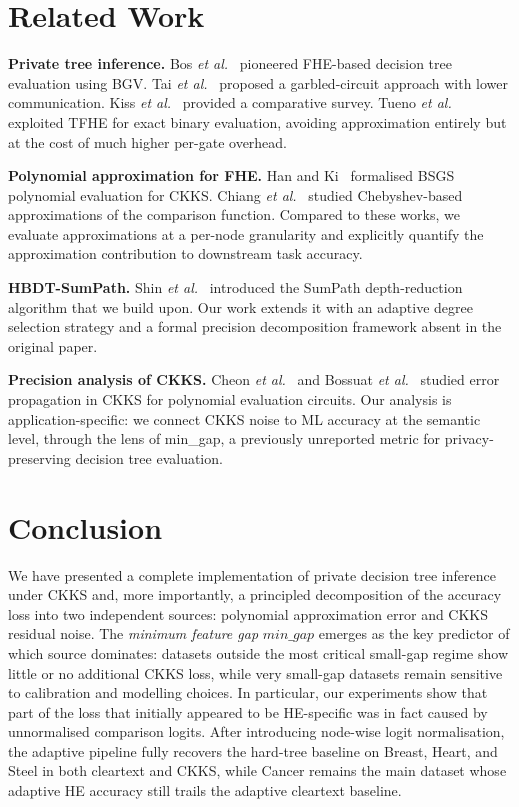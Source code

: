 \documentclass[runningheads]{llncs}
\begin{document}
\section{Related Work}
\label{sec:related}

\textbf{Private tree inference.}  Bos \emph{et al.}~\cite{bos2014private}
pioneered FHE-based decision tree evaluation using BGV.  Tai \emph{et
al.}~\cite{tai2017mining} proposed a garbled-circuit approach with lower
communication.  Kiss \emph{et al.}~\cite{kiss2019sok} provided a
comparative survey.  Tueno \emph{et al.}~\cite{tueno2019private} exploited
TFHE for exact binary evaluation, avoiding approximation entirely but at the
cost of much higher per-gate overhead.

\textbf{Polynomial approximation for FHE.}  Han and Ki~\cite{han2020better}
formalised BSGS polynomial evaluation for CKKS.  Chiang \emph{et
al.}~\cite{chiang2022} studied Chebyshev-based approximations of the
comparison function.  Compared to these works, we evaluate approximations at
a per-node granularity and explicitly quantify the approximation contribution
to downstream task accuracy.

\textbf{HBDT-SumPath.}  Shin \emph{et al.}~\cite{shin2022privacy} introduced
the SumPath depth-reduction algorithm that we build upon.  Our work extends
it with an adaptive degree selection strategy and a formal precision
decomposition framework absent in the original paper.

\textbf{Precision analysis of CKKS.}  Cheon \emph{et
al.}~\cite{cheon2021efficient} and Bossuat \emph{et al.}~\cite{bossuat2021}
studied error propagation in CKKS for polynomial evaluation circuits.  Our
analysis is application-specific: we connect CKKS noise to ML accuracy at
the semantic level, through the lens of min\_gap, a previously unreported
metric for privacy-preserving decision tree evaluation.

\section{Conclusion}
\label{sec:conclusion}

We have presented a complete implementation of private decision tree
inference under CKKS and, more importantly, a principled decomposition of
the accuracy loss into two independent sources: polynomial approximation
error and CKKS residual noise.  The \emph{minimum feature gap}
$\mathit{min\_gap}$ emerges as the key predictor of which source dominates:
datasets outside the most critical small-gap regime show little or no
additional CKKS loss, while very small-gap datasets remain sensitive to
calibration and modelling choices.  In particular, our experiments show
that part of the loss that
initially appeared to be HE-specific was in fact caused by unnormalised
comparison logits.  After introducing node-wise logit normalisation, the
adaptive pipeline fully recovers the hard-tree baseline on Breast, Heart,
and Steel in both cleartext and CKKS, while Cancer remains the main dataset
whose adaptive HE accuracy still trails the adaptive cleartext baseline.
\end{document}
